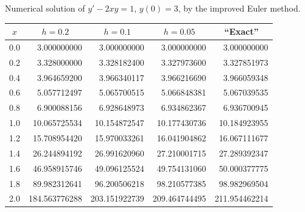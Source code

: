 \begin{examplesolution}
\begin{newtable}
  \label{table:3.2.4} Numerical solution of $y'-2xy=1$, $y(0)=3$, by the improved Euler method.
  \begin{center}
    \begin{tabular}{|c|r|r|r|r|}
      \hline
      \multicolumn{1}{|c|}{$x$} & \multicolumn{1}{|c|}{$h=0.2$} & \multicolumn{1}{|c|}{$h=0.1$} & \multicolumn{1}{|c|}{$h=0.05$} & \multicolumn{1}{|c|}{``Exact''} \\
      \hline
      0.0                       & 3.000000000                   & 3.000000000                   & 3.000000000                    & 3.000000000                     \\
      0.2                       & 3.328000000                   & 3.328182400                   & 3.327973600                    & 3.327851973                     \\
      0.4                       & 3.964659200                   & 3.966340117                   & 3.966216690                    & 3.966059348                     \\
      0.6                       & 5.057712497                   & 5.065700515                   & 5.066848381                    & 5.067039535                     \\
      0.8                       & 6.900088156                   & 6.928648973                   & 6.934862367                    & 6.936700945                     \\
      1.0                       & 10.065725534                  & 10.154872547                  & 10.177430736                   & 10.184923955                    \\
      1.2                       & 15.708954420                  & 15.970033261                  & 16.041904862                   & 16.067111677                    \\
      1.4                       & 26.244894192                  & 26.991620960                  & 27.210001715                   & 27.289392347                    \\
      1.6                       & 46.958915746                  & 49.096125524                  & 49.754131060                   & 50.000377775                    \\
      1.8                       & 89.982312641                  & 96.200506218                  & 98.210577385                   & 98.982969504                    \\
      2.0                       & 184.563776288                 & 203.151922739                 & 209.464744495                  & 211.954462214                   \\
      \hline
    \end{tabular}
  \end{center}
\end{newtable}


\end{examplesolution}
